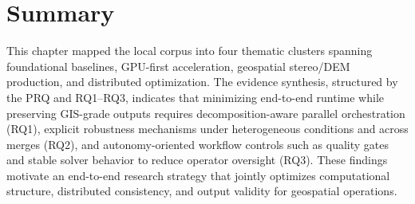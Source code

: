 \section{Summary}

This chapter mapped the local corpus into four thematic clusters spanning foundational baselines, GPU-first acceleration, geospatial stereo/DEM production, and distributed optimization. The evidence synthesis, structured by the PRQ and RQ1--RQ3, indicates that minimizing end-to-end runtime while preserving GIS-grade outputs requires decomposition-aware parallel orchestration (RQ1), explicit robustness mechanisms under heterogeneous conditions and across merges (RQ2), and autonomy-oriented workflow controls such as quality gates and stable solver behavior to reduce operator oversight (RQ3). These findings motivate an end-to-end research strategy that jointly optimizes computational structure, distributed consistency, and output validity for geospatial operations.